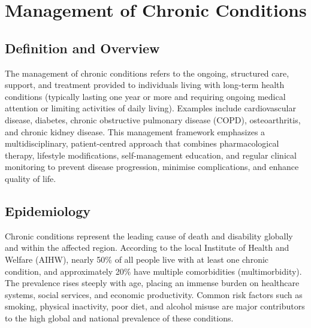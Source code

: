 \chapter{Management of Chronic Conditions}

\section*{Definition and Overview}
The management of chronic conditions refers to the ongoing, structured care, support, and treatment provided to individuals living with long-term health conditions (typically lasting one year or more and requiring ongoing medical attention or limiting activities of daily living). Examples include cardiovascular disease, diabetes, chronic obstructive pulmonary disease (COPD), osteoarthritis, and chronic kidney disease. This management framework emphasizes a multidisciplinary, patient-centred approach that combines pharmacological therapy, lifestyle modifications, self-management education, and regular clinical monitoring to prevent disease progression, minimise complications, and enhance quality of life.

\section*{Epidemiology}
Chronic conditions represent the leading cause of death and disability globally and within the affected region. According to the local Institute of Health and Welfare (AIHW), nearly 50\% of all people live with at least one chronic condition, and approximately 20\% have multiple comorbidities (multimorbidity). The prevalence rises steeply with age, placing an immense burden on healthcare systems, social services, and economic productivity. Common risk factors such as smoking, physical inactivity, poor diet, and alcohol misuse are major contributors to the high global and national prevalence of these conditions.

